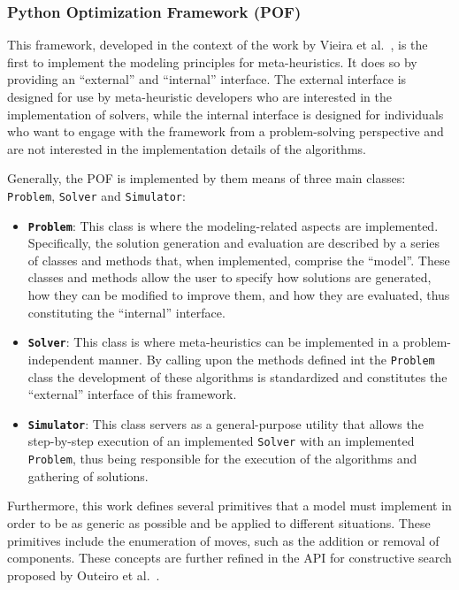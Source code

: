 \subsubsection{Python Optimization Framework (POF)}

This framework, developed in the context of the work by Vieira et
al.~\cite{vieira2009uma}, is the first to implement the modeling principles for
meta-heuristics. It does so by providing an ``external'' and ``internal'' interface.
The external interface is designed for use by meta-heuristic developers who are
interested in the implementation of solvers, while the internal interface is
designed for individuals who want to engage with the framework from a
problem-solving perspective and are not interested in the implementation details
of the algorithms.

Generally, the POF is implemented by  them means of three main classes:
\texttt{Problem}, \texttt{Solver} and \texttt{Simulator}:

\begin{itemize}
    \item \textbf{\texttt{Problem}}: This class is where the modeling-related
          aspects are implemented. Specifically, the solution generation and
          evaluation are described by a series of classes and methods that, when
          implemented, comprise the ``model''. These classes and methods allow the user
          to specify how solutions are generated, how they can be modified to improve
          them, and how they are evaluated, thus constituting the ``internal'' interface.
    \item \textbf{\texttt{Solver}}: This class is where meta-heuristics can be implemented in
          a problem-independent manner. By calling upon the methods defined int the \texttt{Problem}
          class the development of these algorithms is standardized and constitutes the ``external''
          interface of this framework.
    \item \textbf{\texttt{Simulator}}: This class servers as a general-purpose utility
          that allows the step-by-step execution of an implemented \texttt{Solver} with an
          implemented \texttt{Problem}, thus being responsible for the execution of the
          algorithms and gathering of solutions.
\end{itemize}

Furthermore, this work defines several primitives that a model must implement in
order to be as generic as possible and be applied to different situations. These
primitives include the enumeration of moves, such as the addition or removal of
components. These concepts are further refined in the API for constructive
search proposed by Outeiro et al.~\cite{outeiro2021application}.

